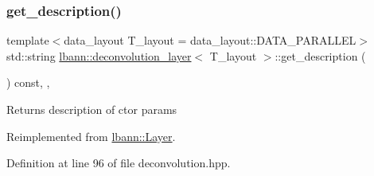 \subsubsection{\texorpdfstring{get\+\_\+description()}{get\_description()}}
{\footnotesize\ttfamily template$<$data\+\_\+layout T\+\_\+layout = data\+\_\+layout\+::\+D\+A\+T\+A\+\_\+\+P\+A\+R\+A\+L\+L\+EL$>$ \\
std\+::string \hyperlink{classlbann_1_1deconvolution__layer}{lbann\+::deconvolution\+\_\+layer}$<$ T\+\_\+layout $>$\+::get\+\_\+description (\begin{DoxyParamCaption}{ }\end{DoxyParamCaption}) const\hspace{0.3cm}{\ttfamily [inline]}, {\ttfamily [override]}, {\ttfamily [virtual]}}

Returns description of ctor params 

Reimplemented from \hyperlink{classlbann_1_1Layer_acc0803d3428914ca1eb5988c4309174a}{lbann\+::\+Layer}.



Definition at line 96 of file deconvolution.\+hpp.


